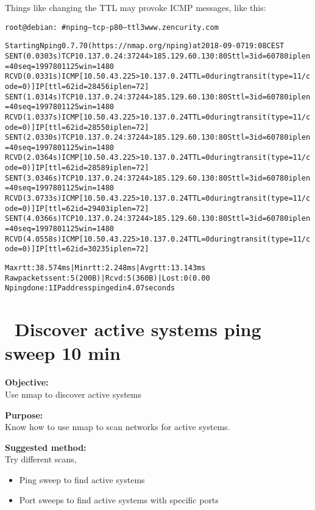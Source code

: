 \documentclass[a4paper,11pt,notitlepage]{report}
\begin{document}
\eject
Things like changing the TTL may provoke ICMP messages, like this:
\begin{alltt}\footnotesize
root@debian:~# nping --tcp -p 80 --ttl 3 www.zencurity.com

Starting Nping 0.7.70 ( https://nmap.org/nping ) at 2018-09-07 19:08 CEST
SENT (0.0303s) TCP 10.137.0.24:37244 > 185.129.60.130:80 S ttl=3 id=60780 iplen=40  seq=1997801125 win=1480
RCVD (0.0331s) ICMP [10.50.43.225 > 10.137.0.24 TTL=0 during transit (type=11/code=0) ] IP [ttl=62 id=28456 iplen=72 ]
SENT (1.0314s) TCP 10.137.0.24:37244 > 185.129.60.130:80 S ttl=3 id=60780 iplen=40  seq=1997801125 win=1480
RCVD (1.0337s) ICMP [10.50.43.225 > 10.137.0.24 TTL=0 during transit (type=11/code=0) ] IP [ttl=62 id=28550 iplen=72 ]
SENT (2.0330s) TCP 10.137.0.24:37244 > 185.129.60.130:80 S ttl=3 id=60780 iplen=40  seq=1997801125 win=1480
RCVD (2.0364s) ICMP [10.50.43.225 > 10.137.0.24 TTL=0 during transit (type=11/code=0) ] IP [ttl=62 id=28589 iplen=72 ]
SENT (3.0346s) TCP 10.137.0.24:37244 > 185.129.60.130:80 S ttl=3 id=60780 iplen=40  seq=1997801125 win=1480
RCVD (3.0733s) ICMP [10.50.43.225 > 10.137.0.24 TTL=0 during transit (type=11/code=0) ] IP [ttl=62 id=29403 iplen=72 ]
SENT (4.0366s) TCP 10.137.0.24:37244 > 185.129.60.130:80 S ttl=3 id=60780 iplen=40  seq=1997801125 win=1480
RCVD (4.0558s) ICMP [10.50.43.225 > 10.137.0.24 TTL=0 during transit (type=11/code=0) ] IP [ttl=62 id=30235 iplen=72 ]

Max rtt: 38.574ms | Min rtt: 2.248ms | Avg rtt: 13.143ms
Raw packets sent: 5 (200B) | Rcvd: 5 (360B) | Lost: 0 (0.00%)
Nping done: 1 IP address pinged in 4.07 seconds
\end{alltt}


\chapter{\faInfoCircle\ Discover active systems ping sweep 10 min}
\label{ex:nmap-pingsweep}

{\bf Objective:}\\
Use nmap to discover active systems

{\bf Purpose:}\\
Know how to use nmap to scan networks for active systems.

{\bf Suggested method:}\\
Try different scans,
\begin{itemize}
\item Ping sweep to find active systems
\item Port sweeps to find active systems with specific ports
\end{itemize}
\end{document}
